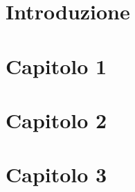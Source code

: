 \documentclass[a4, 12pt, twoside,openany]{book}
\begin{document}
\tableofcontents %

\chapter*{Introduzione} %

\chapter{Capitolo 1}
%

\chapter{Capitolo 2}
%

\chapter{Capitolo 3}

%
\printbibliography %
\end{document}
